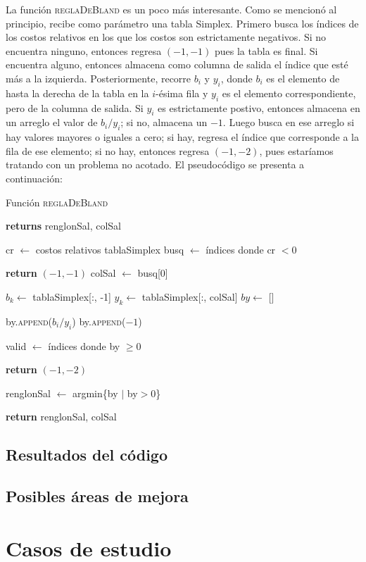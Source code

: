 \documentclass[12pt]{article}
\begin{document}
La función \textsc{reglaDeBland} es un poco más interesante. Como se mencionó al principio, recibe como parámetro una tabla Simplex. Primero busca los índices de los costos relativos en los que los costos son estrictamente negativos. Si no encuentra ninguno, entonces regresa $(-1, -1)$ pues la tabla es final. Si encuentra alguno, entonces almacena como columna de salida el índice que esté más a la izquierda. Posteriormente, recorre $b_i$ y $y_i$, donde $b_i$ es el elemento de hasta la derecha de la tabla en la $i$-ésima fila y $y_i$ es el elemento correspondiente, pero de la columna de salida. Si $y_i$ es estrictamente postivo, entonces almacena en un arreglo el valor de $b_i / y_i$; si no, almacena un $-1$. Luego busca en ese arreglo si hay valores mayores o iguales a cero; si hay, regresa el índice que corresponde a la fila de ese elemento; si no hay, entonces regresa $(-1,-2)$, pues estaríamos tratando con un problema no acotado. El pseudocódigo se presenta a continuación:
\begin{center}
    \begin{algorithm}[H]
    \caption{Función \textsc{reglaDeBland}}
    \begin{algorithmic}
     \textbf{returns} renglonSal, colSal 

    \State cr $\gets$ costos relativos tablaSimplex
    \State busq $\gets$ índices donde cr $< 0$

     
        \State \textbf{return} $(-1,-1)$
    \Else
        \State colSal $\gets$ busq[0]
    \EndIf

    \State $b_k \gets$ tablaSimplex[:, -1]
    \State $y_k \gets$ tablaSimplex[:, colSal]
    \State $by \gets$ []
    
            \State by.\textsc{append}($b_i/y_i$)
        \Else
        \State by.\textsc{append}($-1$)
        \EndIf
    \EndFor

    \State valid $\gets$ índices donde by $\geq 0$

     
        \State \textbf{return} $(-1,-2)$    
    \EndIf

    \State renglonSal $\gets$ argmin\{by $\mid$  by$>0$\}

    \State \textbf{return} renglonSal, colSal

    \EndFunction
    \end{algorithmic}
    \end{algorithm}
\end{center}

\subsection{Resultados del código}

\subsection{Posibles áreas de mejora}

\section{Casos de estudio}

\end{document}
